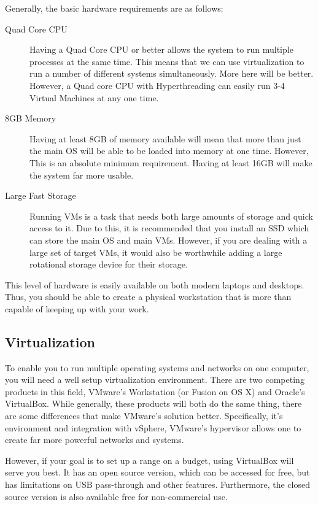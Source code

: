 			Generally, the basic hardware requirements are as follows:
			\begin{description}
				\item[Quad Core CPU] Having a Quad Core CPU or better allows the system to run multiple processes at the same time. 
					This means that we can use virtualization to run a number of different systems simultaneously. 
					More here will be better. However, a Quad core CPU with Hyperthreading can easily run 3-4 Virtual Machines at any one time. 
				\item[8GB Memory] Having at least 8GB of memory available will mean that more than just the main OS will be able to be loaded into memory at one time. 
					However, This is an absolute minimum requirement. 
					Having at least 16GB will make the system far more usable. 
				\item[Large Fast Storage] Running VMs is a task that needs both large amounts of storage and quick access to it. 
					Due to this, it is recommended that you install an SSD which can store the main OS and main VMs. 
					However, if you are dealing with a large set of target VMs, it would also be worthwhile adding a large rotational storage device for their storage. 
			\end{description}

			This level of hardware is easily available on both modern laptops and desktops. 
			Thus, you should be able to create a physical workstation that is more than capable of keeping up with your work. 
			
		\subsection{Virtualization}
			To enable you to run multiple operating systems and networks on one computer, you will need a well setup virtualization environment. 
			There are two competing products in this field, VMware's Workstation (or Fusion on OS X) and Oracle's VirtualBox. 
			While generally, these products will both do the same thing, there are some differences that make VMware's solution better. 
			Specifically, it's environment and integration with vSphere, VMware's hypervisor allows one to create far more powerful networks and systems. 
			
			However, if your goal is to set up a range on a budget, using VirtualBox will serve you best. 
			It has an open source version, which can be accessed for free, but has limitations on USB pass-through and other features. 
			Furthermore, the closed source version is also available free for non-commercial use. 

